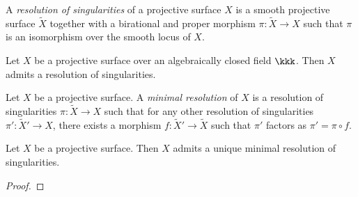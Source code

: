     \begin{definition}%
        A \emph{resolution of singularities} of a projective surface \(X\) is a smooth projective surface \(\widetilde{X}\) together with a birational and proper morphism \(\pi:\widetilde{X}\to X\) such that \(\pi\) is an isomorphism over the smooth locus of \(X\).
    \end{definition}

    \begin{theorem}%
        Let \(X\) be a projective surface over an algebraically closed field \(\kkk\).
        Then \(X\) admits a resolution of singularities.
    \end{theorem}

    \begin{definition}%
        Let \(X\) be a projective surface.
        A \emph{minimal resolution} of \(X\) is a resolution of singularities \(\pi:\widetilde{X}\to X\) such that for any other resolution of singularities \(\pi':\widetilde{X}'\to X\), there exists a morphism \(f:\widetilde{X}'\to \widetilde{X}\) such that \(\pi'\) factors as \(\pi' = \pi \circ f\).
    \end{definition}

    \begin{proposition}%
        Let \(X\) be a projective surface.
        Then \(X\) admits a unique minimal resolution of singularities.
    \end{proposition}
    \begin{proof}
    \end{proof}
